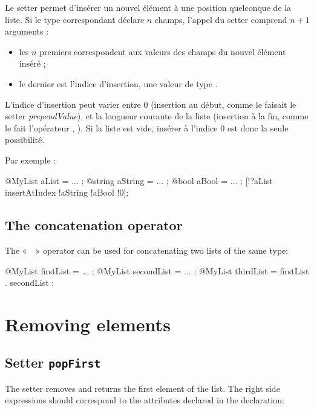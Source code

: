 Le setter  permet d'insérer un nouvel élément à une position quelconque de la liste. Si le type  correspondant déclare $n$ champs, l'appel du setter comprend $n+1$ arguments :
\begin{itemize}
  \item les $n$ premiers correspondent aux valeurs des champs du nouvel élément inséré ;
  \item le dernier est l'indice d'insertion, une valeur de type .
\end{itemize}

L'indice d'insertion peut varier entre $0$ (insertion au début, comme le faisait le setter \emph{prependValue}), et la longueur courante de la liste (insertion à la fin, comme le fait l'opérateur \galgas{+=}, ). Si la liste est vide, insérer à l'indice $0$ est donc la seule possibilité.

Par exemple :

\begin{galgascode}
@MyList aList = ... ;
@string aString = ... ;
@bool aBool = ... ;
[!?aList insertAtIndex !aString !aBool !0];
\end{galgascode}

\subsection{The concatenation operator}

The «~~» operator can be used for concatenating two lists of the same type:


\begin{galgascode}
@MyList firstList = ... ;
@MyList secondList = ... ;
@MyList thirdList = firstList . secondList ;
\end{galgascode}

\section{Removing elements}

\subsection{Setter \texttt{popFirst}}


The  setter removes and returns the first element of the list. The right side expressions should correspond to the attributes declared in the  declaration:

